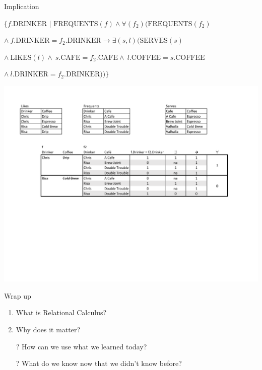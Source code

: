 \documentclass[aspectratio=169]{beamer}
\begin{document}
\begin{frame}{Implication}

$\{f.\textrm{DRINKER } | \textrm{ FREQUENTS}(f) \wedge \forall(f_2)(\textrm{FREQUENTS}(f_2)$

\hspace{2em}$\wedge\ f.\textrm{DRINKER} = f_2.\textrm{DRINKER} \rightarrow \exists(s, l)(\textrm{SERVES}(s)$

\hspace{2em}$ \wedge\ \textrm{LIKES}(l) \wedge\ s.\textrm{CAFE} = f_2.\textrm{CAFE} \wedge\ l.\textrm{COFFEE} = s.\textrm{COFFEE}$

\hspace{2em}$\wedge\	l.\textrm{DRINKER} = f_2.\textrm{DRINKER}))\}$

\vspace{-2em}

 \includegraphics[width=1\textwidth]{./lectRCRA/drinkerFrequentsServes.pdf}
\end{frame}



\begin{frame}{Wrap up}
\begin{enumerate}
\item What is Relational Calculus?
\item Why does it matter?
\end{enumerate}

\begin{itemize}
	\item[?] How can we use what we learned today?
	\vspace{2em}
	\item[?] What do we know now that we didn't know before?
\end{itemize}


\end{frame}
\end{document}

